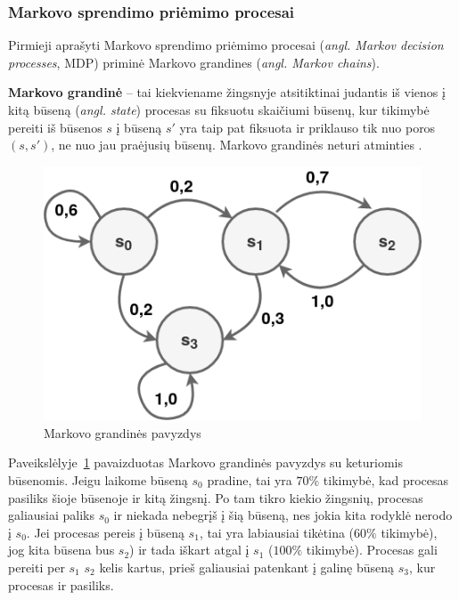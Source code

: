 \documentclass{VUMIFPSbakalaurinis}
\begin{document}
\subsubsection{Markovo sprendimo priėmimo procesai}\label{subsubsec:MDP}
{ 
	Pirmieji aprašyti Markovo sprendimo priėmimo procesai (\textit{angl. Markov decision processes}, MDP) \cite{mdp} priminė Markovo grandines (\textit{angl. Markov chains}).\par
	
	\textbf{Markovo grandinė} -- tai kiekviename žingsnyje atsitiktinai judantis iš vienos į kitą būseną (\textit{angl. state}) procesas su fiksuotu skaičiumi būsenų, kur tikimybė pereiti iš būsenos \(s\) į būseną \(s'\) yra taip pat fiksuota ir priklauso tik nuo poros \((s, s')\), ne nuo jau praėjusių būsenų. Markovo grandinės neturi atminties \cite{handson}. 
	
	\begin{figure}[H]
		\centering
		\includegraphics[scale=0.33]{img/markov_chain}
		\caption{Markovo grandinės pavyzdys}
		\label{img:markovChain}
	\end{figure} 
	
	Paveikslėlyje~\ref{img:markovChain} pavaizduotas Markovo grandinės pavyzdys su keturiomis būsenomis. Jeigu laikome būseną \(s_0\) pradine, tai yra \(70\%\) tikimybė, kad procesas pasiliks šioje būsenoje ir kitą žingsnį. Po tam tikro kiekio žingsnių, procesas galiausiai paliks \(s_0\) ir niekada nebegrįš į šią būseną, nes jokia kita rodyklė nerodo į \(s_0\). Jei procesas pereis į būseną \(s_1\), tai yra labiausiai tikėtina (\(60\%\) tikimybė), jog kita būsena bus \(s_2\)) ir tada iškart atgal į \(s_1\) (\(100\%\) tikimybė). Procesas gali pereiti per \(s_1\) \(s_2\) kelis kartus, prieš galiausiai patenkant į galinę būseną \(s_3\), kur procesas ir pasiliks.\par
	
}
\end{document}
